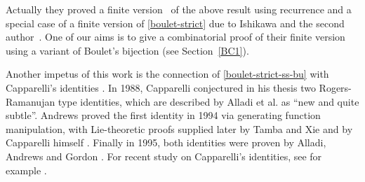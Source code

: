 \documentclass[12pt]{amsart}
\numberwithin{equation}{section}
\theoremstyle{plain}
\theoremstyle{definition}
\begin{document}
Actually they proved a finite version~\cite[Theorem~4.1]{bu2}  of the above result 
using recurrence and a special case of a finite version of 
\eqref{boulet-strict} due to Ishikawa and the second author~\cite[Corollary 3.4]{iz}.
  One of our  aims is to give a combinatorial proof of their finite version
 using a variant of Boulet's bijection (see Section~\ref{BC1}). 


















Another impetus of this work is the connection of \eqref{boulet-strict-ss-bu} with Capparelli's identities \cite{cappa}.
In 1988, Capparelli conjectured in his thesis \cite{cappath} two Rogers-Ramanujan type identities, which are described by Alladi et al. \cite{aag} as ``new and quite subtle''. Andrews proved the first identity in 1994 \cite{and3} via generating function manipulation, with Lie-theoretic proofs supplied later by Tamba and Xie \cite{tx} and by Capparelli himself \cite{cappa}. Finally in 1995, both identities were proven by Alladi, Andrews and Gordon \cite{aag}. For recent study on Capparelli's identities, see for example \cite{sil1,dou,bm,dl}.
\end{document}
